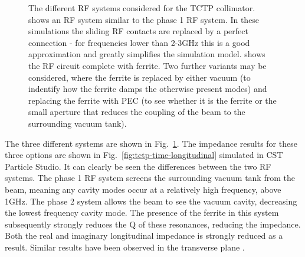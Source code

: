 \begin{figure}
\begin{center}
\end{center}
\caption{The different RF systems considered for the TCTP collimator.  shows an RF system similar to the phase 1 RF system. In these simulations the sliding RF contacts are replaced by a perfect connection - for frequencies lower than 2-3GHz this is a good approximation and greatly simplifies the simulation model.  shows the RF circuit complete with ferrite. Two further variants may be considered, where the ferrite is replaced by either vacuum (to indentify how the ferrite damps the otherwise present modes) and replacing the ferrite with PEC (to see whether it is the ferrite or the small aperture that reduces the coupling of the beam to the surrounding vacuum tank).}
\label{fig:rf-systems-tctp}
\end{figure}


The three different systems are shown in Fig.~\ref{fig:rf-systems-tctp}. The impedance results for these three options are shown in Fig.~\ref{fig:tctp-time-longitudinal} simulated in CST Particle Studio. It can clearly be seen the differences between the two RF systems. The phase 1 RF system screens the surrounding vacuum tank from the beam, meaning any cavity modes occur at a relatively high frequency, above 1GHz. The phase 2 system allows the beam to see the vacuum cavity, decreasing the lowest frequency cavity mode. The presence of the ferrite in this system subsequently strongly reduces the Q of these resonances, reducing the impedance. Both the real and imaginary longitudinal impedance is strongly reduced as a result. Similar results have been observed in the transverse plane \cite{Salvant:tctp}.

